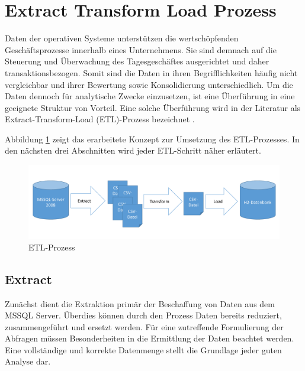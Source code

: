 \section{Extract Transform Load Prozess}
\label{ch:konzeption:etl}

Daten der operativen Systeme unterstützen die wertschöpfenden Geschäftsprozesse innerhalb eines Unternehmens. Sie sind demnach auf die Steuerung und Überwachung des Tagesgeschäftes ausgerichtet und daher transaktionsbezogen. Somit sind die Daten in ihren Begrifflichkeiten häufig nicht vergleichbar und ihrer Bewertung sowie Konsolidierung unterschiedlich. Um die Daten dennoch für analytische Zwecke einzusetzen, ist eine Überführung in eine geeignete Struktur von Vorteil. Eine solche Überführung wird in der Literatur als Extract-Transform-Load (ETL)-Prozess bezeichnet \cite{ElSappagh201191}. 

Abbildung \ref{konzept:etl} zeigt das erarbeitete Konzept zur Umsetzung des ETL-Prozesses. In den nächsten drei Abschnitten wird jeder ETL-Schritt näher erläutert.

\begin{figure}[htbp]
\centering
  \includegraphics[width=1.0\textwidth, width=1.0\textwidth]{pics/ETL.pdf}
\caption{ETL-Prozess}
\label{konzept:etl}
\end{figure} 


\subsection{Extract}

Zunächst dient die Extraktion primär der Beschaffung von Daten aus dem MSSQL Server. Überdies können durch den Prozess Daten bereits reduziert,  zusammengeführt und ersetzt werden. Für eine zutreffende Formulierung der Abfragen müssen Besonderheiten in die Ermittlung der Daten beachtet werden. Eine vollständige und korrekte Datenmenge stellt die Grundlage jeder guten Analyse dar.

